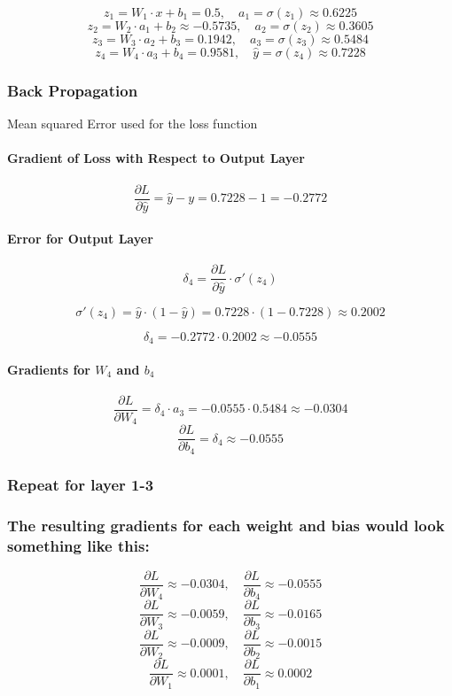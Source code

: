 \documentclass{article}
\begin{document}
\[
z_1 = W_1 \cdot x + b_1 = 0.5, \quad a_1 = \sigma(z_1) \approx 0.6225
\]
\[
z_2 = W_2 \cdot a_1 + b_2 \approx -0.5735, \quad a_2 = \sigma(z_2) \approx 0.3605
\]
\[
z_3 = W_3 \cdot a_2 + b_3 = 0.1942, \quad a_3 = \sigma(z_3) \approx 0.5484
\]
\[
z_4 = W_4 \cdot a_3 + b_4 = 0.9581, \quad \hat{y} = \sigma(z_4) \approx 0.7228
\]

\subsubsection{Back Propagation} Mean squared Error used for the loss function


\paragraph{Gradient of Loss with Respect to Output Layer}

\[
\frac{\partial L}{\partial \hat{y}} = \hat{y} - y = 0.7228 - 1 = -0.2772
\]

\paragraph{Error for Output Layer}
\[
\delta_4 = \frac{\partial L}{\partial \hat{y}} \cdot \sigma'(z_4)
\]

\[
\sigma'(z_4) = \hat{y} \cdot (1 - \hat{y}) = 0.7228 \cdot (1 - 0.7228) \approx 0.2002
\]

\[
\delta_4 = -0.2772 \cdot 0.2002 \approx -0.0555
\]

\paragraph{Gradients for \( W_4 \) and \( b_4 \)}
\[
\frac{\partial L}{\partial W_4} = \delta_4 \cdot a_3 = -0.0555 \cdot 0.5484 \approx -0.0304
\]
\[
\frac{\partial L}{\partial b_4} = \delta_4 \approx -0.0555
\]


\subsubsection{Repeat for layer 1-3}

\subsubsection{The resulting gradients for each weight and bias would look something like this:}
\[
\frac{\partial L}{\partial W_4} \approx -0.0304, \quad \frac{\partial L}{\partial b_4} \approx -0.0555
\]
\[
\frac{\partial L}{\partial W_3} \approx -0.0059, \quad \frac{\partial L}{\partial b_3} \approx -0.0165
\]
\[
\frac{\partial L}{\partial W_2} \approx -0.0009, \quad \frac{\partial L}{\partial b_2} \approx -0.0015
\]
\[
\frac{\partial L}{\partial W_1} \approx 0.0001, \quad \frac{\partial L}{\partial b_1} \approx 0.0002
\]
\end{document}
